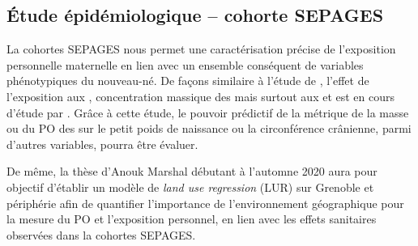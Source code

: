 \subsection{Étude épidémiologique -- cohorte SEPAGES}

La cohortes SEPAGES nous permet une caractérisation précise de l'exposition personnelle
maternelle en lien avec un ensemble conséquent de variables phénotypiques du nouveau-né.
De façons similaire à l'étude de \cite{ouidirEstimation2015}, l'effet de l'exposition aux
, concentration massique des \PMdc mais surtout aux \POAAv{} et \PODTTv{} est en
cours d'étude par \cite{borlazaPersonalinprep.}.
Grâce à cette étude, le pouvoir prédictif de la métrique de la masse ou du PO des \PMdc{}
sur le petit poids de naissance ou la circonférence crânienne, parmi d'autres variables,
pourra être évaluer.

De même, la thèse d'Anouk Marshal débutant à l'automne 2020 aura pour objectif d'établir
un modèle de \textit{land use regression} (LUR) sur Grenoble et périphérie afin de
quantifier l'importance de l'environnement géographique pour la mesure du PO et
l'exposition personnel, en lien avec les effets sanitaires observées dans la
cohortes SEPAGES.


